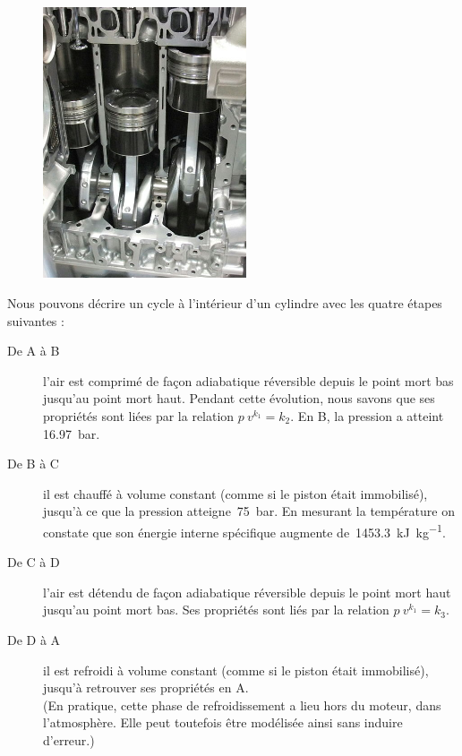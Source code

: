 		\begin{figure}
			\begin{center}
				\includegraphics[width=6cm, max width=0.8\columnwidth]{images/pistons_cutaway.jpg}
			\end{center}
			\label{fig_exo_pistons}
		\end{figure}
	
	Nous pouvons décrire un cycle à l’intérieur d’un cylindre avec les quatre étapes suivantes :
	
	\begin{description}
			\item [De A à B] l’air est comprimé de façon adiabatique réversible depuis le point mort bas jusqu’au point mort haut. Pendant cette évolution, nous savons que ses propriétés sont liées par la relation $p \ v^{k_1} = k_2$. En B, la pression a atteint \SI{16,97}{\bar}. 
			\item [De B à C] il est chauffé à volume constant (comme si le piston était immobilisé), jusqu’à ce que la pression atteigne~\SI{75}{\bar}. En mesurant la température on constate que son énergie interne spécifique augmente de~\SI{1453,3}{\kilo\joule\per\kilogram}.
			\item [De C à D] l’air est détendu de façon adiabatique réversible depuis le point mort haut jusqu’au point mort bas. Ses propriétés sont liés par la relation $p \ v^{k_1} = k_3$.
			\item [De D à A] il est refroidi à volume constant (comme si le piston était immobilisé), jusqu’à retrouver ses propriétés en A.\\
				(En pratique, cette phase de refroidissement a lieu hors du moteur, dans l’atmosphère. Elle peut toutefois être modélisée ainsi sans induire d’erreur.)
	\end{description}

